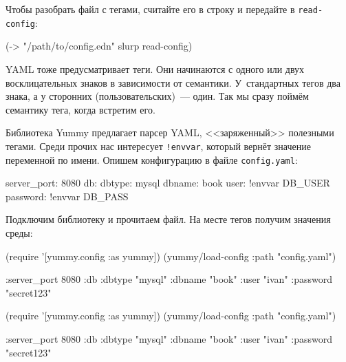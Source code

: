 Чтобы разобрать файл с тегами, считайте его в строку и передайте в
\verb|read-config|:

\begin{english}
  \begin{clojure}
(-> "/path/to/config.edn"
    slurp
    read-config)
  \end{clojure}
\end{english}

YAML тоже предусматривает теги. Они начинаются с одного или двух восклицательных
знаков в зависимости от семантики. У~стандартных тегов два знака, а у сторонних
(пользовательских)~--- один. Так мы сразу поймём семантику тега, когда встретим
его.


Библиотека Yummy предлагает парсер YAML, <<заряженный>> полезными тегами. Среди
прочих нас интересует \verb|!envvar|, который вернёт значение переменной по
имени. Опишем конфигурацию в файле \verb|config.yaml|:

\begin{english}
  \begin{yaml}
server_port: 8080
db:
  dbtype:   mysql
  dbname:   book
  user:     !envvar DB_USER
  password: !envvar DB_PASS
  \end{yaml}
\end{english}

Подключим библиотеку и прочитаем файл. На месте тегов получим значения среды:

\ifx\DEVICETYPE\MOBILE

\begin{english}
  \begin{clojure}
(require '[yummy.config :as yummy])
(yummy/load-config
  {:path "config.yaml"})

{:server_port 8080
 :db {:dbtype "mysql"
      :dbname "book"
      :user "ivan"
      :password "secret123"}}
  \end{clojure}
\end{english}

\else

\begin{english}
  \begin{clojure}
(require '[yummy.config :as yummy])
(yummy/load-config {:path "config.yaml"})

{:server_port 8080
 :db {:dbtype "mysql"
      :dbname "book"
      :user "ivan"
      :password "secret123"}}
  \end{clojure}
\end{english}
\fi


